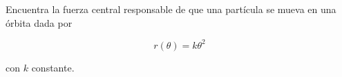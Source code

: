 \documentclass[../main.tex]{subfiles}
\begin{document}
\begin{problema}
	Encuentra la fuerza central responsable de que una partícula se
	mueva en una órbita dada por

	\begin{equation}
		r(\theta) = k\theta^{2}
	\end{equation}

	con \(k\) constante.
\end{problema}
\end{document}
